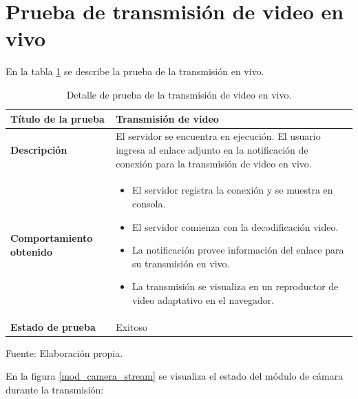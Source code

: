 \section{Prueba de transmisión de video en vivo}

En la tabla \ref{stream_camera} se describe la prueba de la transmisión en vivo.\\

\begin{table}[H]
    \caption{Detalle de prueba de la transmisión de video en vivo.}
    \begin{center}
        \begin{tabular}{|>{\centering}p{}|m{}<{\centering}|} 
            \hline
            \textbf{Título de la prueba} & Transmisión de video\\
            \hline
            \textbf{Descripción} & El servidor se encuentra en ejecución. El usuario ingresa al enlace adjunto en la notificación de conexión para la transmisión de video en vivo.\\
            \hline
            \textbf{Comportamiento obtenido} & 
            \begin{itemize}
                \item El servidor registra la conexión y se muestra en consola.
                \item El servidor comienza con la decodificación video.
                \item La notificación provee información del enlace para su transmisión en vivo.
                \item La transmisión se visualiza en un reproductor de video adaptativo en el navegador.
            \end{itemize} \\ 
            \hline
            \textbf{Estado de prueba} & Exitoso \\
            \hline
        \end{tabular}
    \end{center}
    \begin{center}
        Fuente: Elaboración propia.
        \label{stream_camera}
    \end{center}
\end{table}

En la figura \ref{mod_camera_stream} se visualiza el estado del módulo de cámara durante la transmisión:\\

